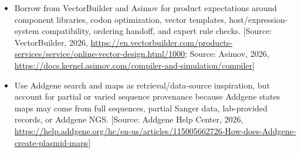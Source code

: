 \documentclass[11pt]{report}
\begin{document}
\begin{itemize}
\item Borrow from VectorBuilder and Asimov for product expectations around component libraries, codon optimization, vector templates, host/expression-system compatibility, ordering handoff, and expert rule checks. [Source: VectorBuilder, 2026, \url{https://en.vectorbuilder.com/products-services/service/online-vector-design.html/1000}; Source: Asimov, 2026, \url{https://docs.kernel.asimov.com/compiler-and-simulation/compiler}]
\item Use Addgene search and maps as retrieval/data-source inspiration, but account for partial or varied sequence provenance because Addgene states maps may come from full sequences, partial Sanger data, lab-provided records, or Addgene NGS. [Source: Addgene Help Center, 2026, \url{https://help.addgene.org/hc/en-us/articles/115005662726-How-does-Addgene-create-plasmid-maps}]
\end{itemize}
\end{document}

